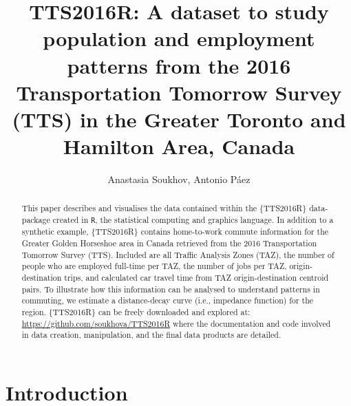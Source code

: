 \documentclass[Royal,times,sageh]{sagej}
\begin{document}

\title{TTS2016R: A dataset to study population and employment patterns
from the 2016 Transportation Tomorrow Survey (TTS) in the Greater
Toronto and Hamilton Area, Canada}

\runninghead{}

\author{Anastasia Soukhov\affilnum{}, Antonio Páez\affilnum{}}

\affiliation{\affilnum{}{}}



\begin{abstract}
This paper describes and visualises the data contained within the
\{TTS2016R\} data-package created in \texttt{R}, the statistical
computing and graphics language. In addition to a synthetic example,
\{TTS2016R\} contains home-to-work commute information for the Greater
Golden Horseshoe area in Canada retrieved from the 2016 Transportation
Tomorrow Survey (TTS). Included are all Traffic Analysis Zones (TAZ),
the number of people who are employed full-time per TAZ, the number of
jobs per TAZ, origin-destination trips, and calculated car travel time
from TAZ origin-destination centroid pairs. To illustrate how this
information can be analysed to understand patterns in commuting, we
estimate a distance-decay curve (i.e., impedance function) for the
region. \{TTS2016R\} can be freely downloaded and explored at:
\url{https://github.com/soukhova/TTS2016R} where the documentation and
code involved in data creation, manipulation, and the final data
products are detailed.
\end{abstract}


\maketitle

\hypertarget{introduction}{%
\section{Introduction}\label{introduction}}
\end{document}
